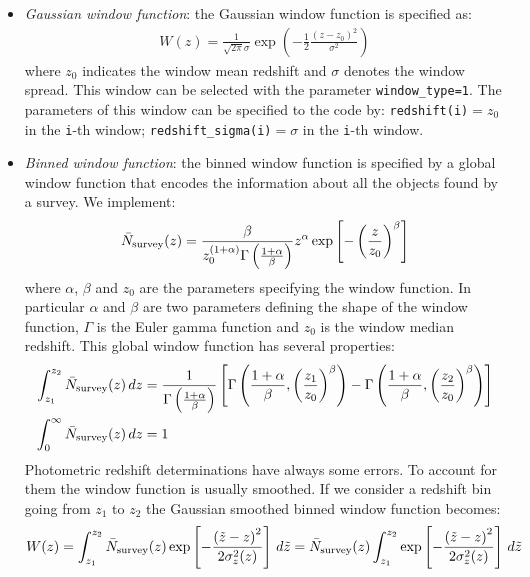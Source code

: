 \documentclass[prd,nofootinbib,showpacs]{revtex4}
\newcommand{\code}[1]{\lstinline|#1|}
\begin{document}
%
\begin{itemize}
\item {\it Gaussian window function}: the Gaussian window function is specified as:
%
\begin{align}\label{Eq:GaussianWindow}
W(z) = \frac{1}{\sqrt{2\pi} \sigma} \exp \left( -\frac{1}{2}\frac{\left( z-z_0\right)^2}{\sigma^2}\right)
\end{align}
%
where $z_0$ indicates the window mean redshift and $\sigma$ denotes the window spread. This window can be selected with the parameter \code{window_type=1}. The parameters of this window can be specified to the code by: \code{redshift(i)}$=z_0$ in the \code{i}-th window; \code{redshift_sigma(i)}$=\sigma$ in the \code{i}-th window. 
\item {\it Binned window function}: the binned window function is specified by a global window function that encodes the information about all the objects found by a survey. We implement:
%
\begin{align} \label{Eq:GlobalBinWindow}
\bar{N}_{\rm survey}(z) = \frac{\beta}{z_0^{(1+\alpha)} \Gamma\left(\frac{1+\alpha}{\beta} \right)}z^\alpha \exp\left[ -\left(\frac{z}{z_0}\right)^\beta \right]
\end{align}
%
where $\alpha$, $\beta$ and $z_0$ are the parameters specifying the window function. In particular $\alpha$ and $\beta$ are two parameters defining the shape of the window function, $\Gamma$ is the Euler gamma function and $z_0$ is the window median redshift.
This global window function has several properties:
%
\begin{align} \label{Eq:GlobalBinWindowProperties}
\int_{z_1}^{z_2} \bar{N}_{\rm survey}(z) \,dz &= \frac{1}{\Gamma\left(\frac{1+\alpha}{\beta} \right)} \left[ \Gamma\left(\frac{1+\alpha}{\beta}, \left(\frac{z_1}{z_0}\right)^\beta \right) - \Gamma\left(\frac{1+\alpha}{\beta}, \left(\frac{z_2}{z_0}\right)^\beta \right) \right] \nonumber \\
\int_{0}^{\infty} \bar{N}_{\rm survey}(z) \,dz &= 1
\end{align}
%
Photometric redshift determinations have always some errors. To account for them the window function is usually smoothed.
%
If we consider a redshift bin going from $z_1$ to $z_2$ the Gaussian smoothed binned window function becomes:
%
\begin{align} \label{Eq:BinWindow}
W(z) &= \int_{z_1}^{z_2} \bar{N}_{\rm survey}(z) \exp \left[ -\frac{\left( \tilde{z} - z \right)^2}{2\sigma_z^2(z)}\right] \, d\tilde{z} = \bar{N}_{\rm survey}(z) \int_{z_1}^{z_2} \exp \left[ -\frac{\left( \tilde{z} - z \right)^2}{2\sigma_z^2(z)}\right] \, d\tilde{z} \nonumber \\

\end{align}
\end{itemize}
\end{document}
